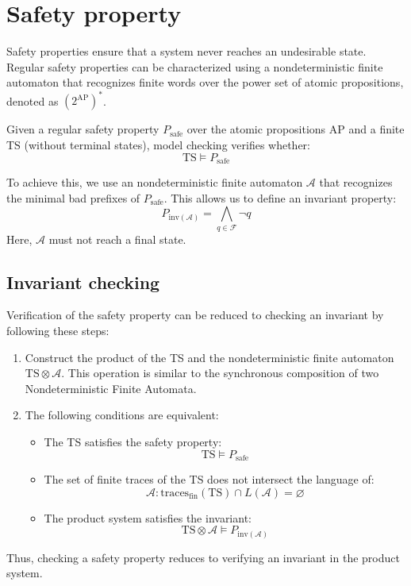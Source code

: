 \section{Safety property}

Safety properties ensure that a system never reaches an undesirable state. 
Regular safety properties can be characterized using a nondeterministic finite automaton that recognizes finite words over the power set of atomic propositions, denoted as $\left(2^{\text{AP}}\right)^\ast$.

\begin{definition}
    Given a regular safety property $P_{\text{safe}}$ over the atomic propositions $\text{AP}$ and a finite TS (without terminal states), model checking verifies whether:
    \[\text{TS}\models P_{\text{safe}}\]
\end{definition}
\noindent 
To achieve this, we use an nondeterministic finite automaton $\mathcal{A}$ that recognizes the minimal bad prefixes of $P_{\text{safe}}$.
This allows us to define an invariant property:
\[P_{\text{inv}(\mathcal{A})}=\bigwedge_{q\in\mathcal{F}}\lnot q\]
Here, $\mathcal{A}$ must not reach a final state.

\subsection{Invariant checking}
Verification of the safety property can be reduced to checking an invariant by following these steps:
\begin{enumerate}
    \item Construct the product of the TS and the nondeterministic finite automaton $\text{TS}\otimes \mathcal{A}$. 
        This operation is similar to the synchronous composition of two Nondeterministic Finite Automata.
    \item The following conditions are equivalent:
        \begin{itemize}
            \item The TS satisfies the safety property: 
                \[\text{TS} \models P_{\text{safe}}\]
            \item The set of finite traces of the TS does not intersect the language of:
                \[\mathcal{A}: \text{traces}_{\text{fin}}(\text{TS}) \cap L(\mathcal{A}) = \varnothing\]
            \item The product system satisfies the invariant:
                \[\text{TS}\otimes \mathcal{A} \models P_{\text{inv}(\mathcal{A})}\]
        \end{itemize}
\end{enumerate}
\noindent Thus, checking a safety property reduces to verifying an invariant in the product system.

